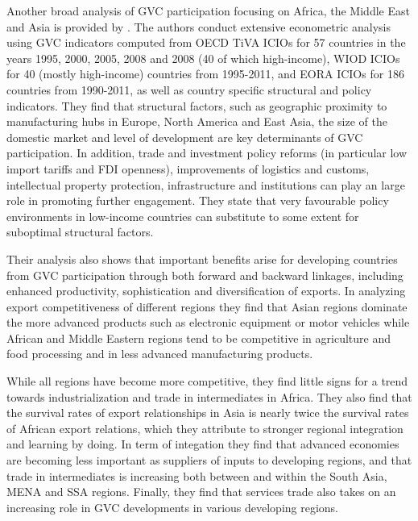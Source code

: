 \documentclass[a4paper]{article}
\begin{document}
Another broad analysis of GVC participation focusing on Africa, the Middle East and Asia is provided by \citet{kowalski2015participation}. The authors conduct extensive econometric analysis using GVC indicators computed from OECD TiVA ICIOs for 57 countries in the years 1995, 2000, 2005, 2008 and 2008 (40 of which high-income), WIOD ICIOs for 40 (mostly high-income) countries from 1995-2011, and EORA ICIOs for 186 countries from 1990-2011, as well as country specific structural and policy indicators. They find that structural factors, such as geographic proximity to manufacturing hubs in Europe, North America and East Asia, the size of the domestic market and level of development are key determinants of GVC participation. In addition, trade and investment policy reforms (in particular low import tariffs and FDI openness), improvements of logistics and customs, intellectual property protection, infrastructure and institutions can play an large role in promoting further engagement. They state that very favourable policy environments in low-income countries can substitute to some extent for suboptimal structural factors. \newline 

Their analysis also shows that important benefits arise for developing countries from GVC participation through both forward and backward linkages, including enhanced productivity, sophistication and diversification of exports. In analyzing export competitiveness of different regions they find that Asian regions dominate the more advanced products such as electronic equipment or motor vehicles while African and Middle Eastern regions tend to be competitive in agriculture and food processing and in less advanced manufacturing products. \newline 

While all regions have become more competitive, they find little signs for a trend towards industrialization and trade in intermediates in Africa. They also find that the survival rates of export relationships in Asia is nearly twice the survival rates of African export relations, which they attribute to stronger regional integration and learning by doing. In term of integation they find that advanced economies are becoming less important as suppliers of inputs to developing regions, and that trade in intermediates is increasing both between and within the South Asia, MENA and SSA regions. Finally, they find that services trade also takes on an increasing role in GVC developments in various developing regions. \newline 
\end{document}
